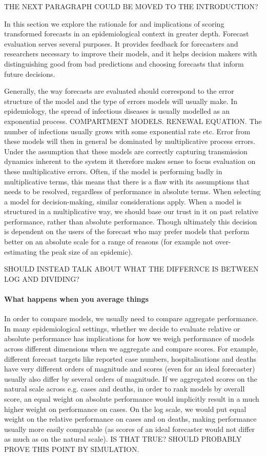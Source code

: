 \documentclass{article}
\begin{document}
THE NEXT PARAGRAPH COULD BE MOVED TO THE INTRODUCTION?

In this section we explore the rationale for and implications of scoring transformed forecasts in an epidemiological context in greater depth. Forecast evaluation serves several purposes. It provides feedback for forecasters and researchers necessary to improve their models, and it helps decision makers with distinguishing good from bad predictions and choosing forecasts that inform future decisions. 

Generally, the way forecasts are evaluated should correspond to the error structure of the model and the type of errors models will usually make. In epidemiology, the spread of infectious diseases is usually modelled as an exponential process. COMPARTMENT MODELS. RENEWAL EQUATION. The number of infections usually grows with some exponential rate etc. Error from these models will then in general be dominated by multiplicative process errors. Under the assumption that these models are correctly capturing transmission dynamics inherent to the system it therefore makes sense to focus evaluation on these multiplicative errors. Often, if the model is performing badly in multiplicative terms, this means that there is a flaw with its assumptions that needs to be resolved, regardless of performance in absolute terms. When selecting a model for decision-making, similar considerations apply. When a model is structured in a multiplicative way, we should base our trust in it on past relative performance, rather than absolute performance. Though ultimately this decision is dependent on the users of the forecast who may prefer models that perform better on an absolute scale for a range of reasons (for example not over-estimating the peak size of an epidemic). 

SHOULD INSTEAD TALK ABOUT WHAT THE DIFFERNCE IS BETWEEN LOG AND DIVIDING? 

\paragraph{What happens when you average things}
In order to compare models, we usually need to compare aggregate performance. In many epidemiological settings, whether we decide to evaluate relative or absolute performance has implications for how we weigh performance of models across different dimensions when we aggregate and compare scores. For example, different forecast targets like reported case numbers, hospitalisations and deaths have very different orders of magnitude and scores (even for an ideal forecaster) usually also differ by several orders of magnitude. If we aggregated scores on the natural scale across e.g. cases and deaths, in order to rank models by overall score, an equal weight on absolute performance would implicitly result in a much higher weight on performance on cases. On the log scale, we would put equal weight on the relative performance on cases and on deaths, making performance usually more easily comparable (as scores of an ideal forecaster would not differ as much as on the natural scale). 
IS THAT TRUE? SHOULD PROBABLY PROVE THIS POINT BY SIMULATION. 
\end{document}
